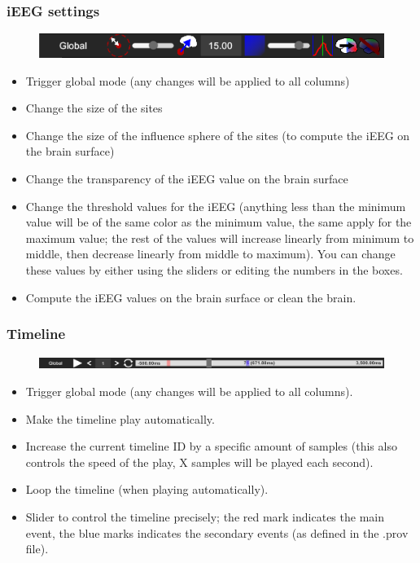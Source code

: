\documentclass[a4paper]{article}
\begin{document}
\subsubsection{iEEG settings}
\begin{figure}[H]
\begin{center}
\includegraphics[scale=0.45]{iEEGSettings.png}
\end{center}
\end{figure}
\begin{itemize}
\item Trigger global mode (any changes will be applied to all columns)
\item Change the size of the sites
\item Change the size of the influence sphere of the sites (to compute the iEEG on the brain surface)
\item Change the transparency of the iEEG value on the brain surface
\item Change the threshold values for the iEEG (anything less than the minimum value will be of the same color as the minimum value, the same apply for the maximum value; the rest of the values will increase linearly from minimum to middle, then decrease linearly from middle to maximum). You can change these values by either using the sliders or editing the numbers in the boxes.
\item Compute the iEEG values on the brain surface or clean the brain.
\end{itemize}
\subsubsection{Timeline}
\begin{figure}[H]
\begin{center}
\includegraphics[scale=0.45]{Timeline.png}
\end{center}
\end{figure}
\begin{itemize}
\item Trigger global mode (any changes will be applied to all columns).
\item Make the timeline play automatically.
\item Increase the current timeline ID by a specific amount of samples (this also controls the speed of the play, X samples will be played each second).
\item Loop the timeline (when playing automatically).
\item Slider to control the timeline precisely; the red mark indicates the main event, the blue marks indicates the secondary events (as defined in the .prov file).
\end{itemize}
\end{document}

